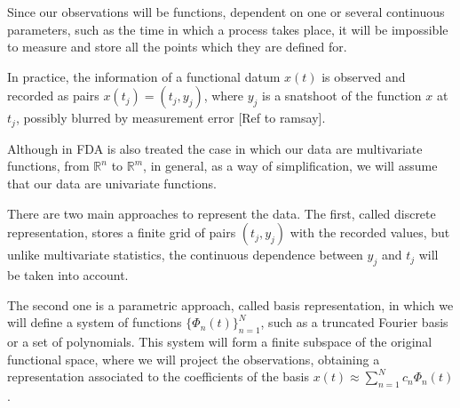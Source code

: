 Since our observations will be functions, dependent on one or several continuous parameters, such as the time in which a process takes place, it will be impossible to measure and store all the points which they are defined for.

In practice, the information of a functional datum $x(t)$ is observed and recorded as pairs $x(t_j) = (t_j, y_j)$, where $y_j$ is a snatshoot of the function $x$ at $t_j$, possibly blurred by measurement error [Ref to ramsay].

Although in FDA is also treated the case in which our data are multivariate functions, from  $\mathbb{R}^n$ to $\mathbb{R}^m$, in general, as a way of simplification, we will assume that our data are univariate functions.

There are two main approaches to represent the data. The first, called discrete representation, stores a finite grid of pairs $(t_j, y_j)$ with the recorded values, but unlike multivariate statistics, the continuous dependence between $y_j$ and $t_j$ will be taken into account.

The second one is a parametric approach, called basis representation, in which we will define a system of functions $\{\Phi_n(t) \}_{n=1}^N$, such as a truncated Fourier basis or a set of polynomials. This system will form a finite subspace of the original functional space, where we will project the observations, obtaining a representation associated to the coefficients of the basis $x(t) \approx \sum_{n=1}^N c_n\Phi_n(t)$.
